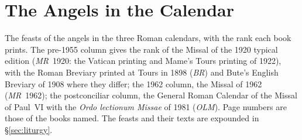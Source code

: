 \section{The Angels in the Calendar}\label{app:calendar}

The feasts of the angels in the three Roman calendars, with the rank each
book prints. The pre-1955 column gives the rank of the Missal of the 1920
typical edition (\emph{MR}~1920: the Vatican printing and Mame's Tours
printing  of 1922), with the Roman Breviary printed
at Tours in 1898 (\emph{BR}) and Bute's English Breviary of 1908 where
they differ; the 1962 column, the Missal of 1962 (\emph{MR}~1962); the
postconciliar column, the General Roman Calendar of the Missal of Paul~VI
with the \emph{Ordo lectionum Missae} of 1981 (\emph{OLM}). Page numbers are
those of the books named. The feasts and their texts are expounded in
\S\ref{sec:liturgy}.

